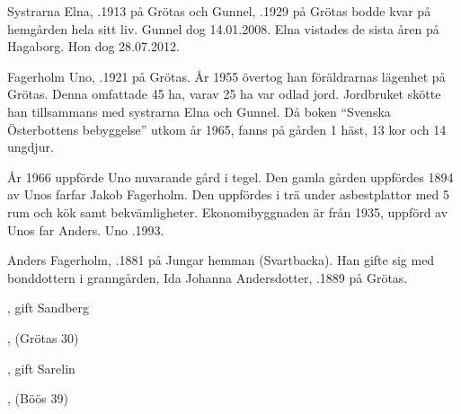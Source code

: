%
Systrarna Elna, .1913 på Grötas och Gunnel, .1929 på Grötas bodde kvar på hemgården hela sitt liv. Gunnel dog 14.01.2008. Elna vistades de sista åren på Hagaborg. Hon dog 28.07.2012.\jhvspace{}



%



%
Fagerholm Uno, .1921 på Grötas. År 1955 övertog han föräldrarnas lägenhet på Grötas. Denna omfattade 45 ha, varav 25 ha var odlad jord. Jordbruket skötte han tillsammans med systrarna Elna och Gunnel. Då boken ``Svenska Österbottens bebyggelse'' utkom år 1965, fanns på gården 1 häst, 13 kor och 14 ungdjur.

År 1966 uppförde Uno nuvarande gård i tegel. Den gamla gården uppfördes 1894 av Unos farfar Jakob Fagerholm. Den uppfördes i trä under asbestplattor med 5 rum och kök samt bekvämligheter. Ekonomibyggnaden är från 1935, uppförd av Unos far Anders.
Uno .1993.


%
Anders Fagerholm, .1881 på Jungar hemman (Svartbacka). Han gifte sig med bonddottern i granngården, Ida Johanna Andersdotter, .1889 på Grötas.
\begin{jhchildren}
  \item {}, gift Sandberg
  \item {}
  \item {}
  \item {}, (Grötas 30)
  \item {}
  \item {}, gift Sarelin
  \item {}, (Böös 39)
  \item {}
\end{jhchildren}

